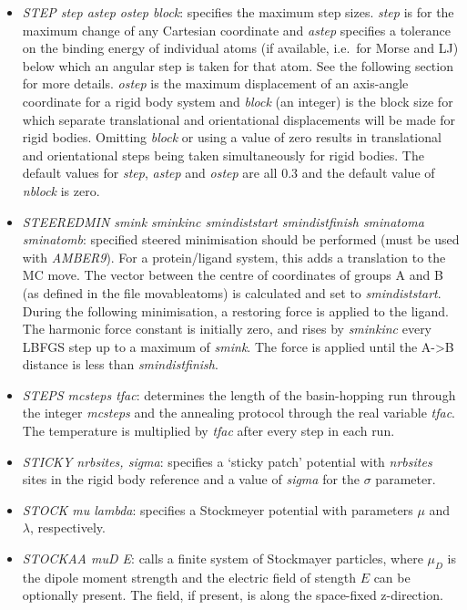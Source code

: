 \documentclass[12pt,a4paper,dvips]{article}
\begin{document}
\begin{itemize}
\item {\it STEP step astep ostep block\/}: specifies the maximum step sizes. {\it step\/} is
for the maximum change of any Cartesian coordinate and {\it astep\/} specifies a tolerance
on the binding energy of individual atoms (if available, i.e.~for Morse and LJ) below
which an angular step is taken for that atom. See the following section for more details.
{\it ostep\/} is the maximum displacement of an axis-angle coordinate for a rigid body system
and {\it block\/} (an integer) is the block size for which separate translational and orientational
displacements will be made for rigid bodies. Omitting {\it block\/} or using a value of zero results in
translational and orientational steps being taken simultaneously
for rigid bodies. The default values for {\it step\/},
{\it astep\/} and {\it ostep\/} are all 0.3 and the default value of {\it nblock\/} is zero.

\item {\it STEEREDMIN smink sminkinc smindiststart smindistfinish sminatoma sminatomb\/}: specified steered 
minimisation should be performed (must be used with {\it AMBER9}). For a protein/ligand system, this adds a translation
to the MC move. The vector between the centre of coordinates of groups A and B (as defined in the file movableatoms)
is calculated and set to {\it smindiststart}. During the following minimisation, a restoring force is applied to 
the ligand. The harmonic force constant is initially zero, and rises by {\it sminkinc} every LBFGS step up to a
maximum of {\it smink}. The force is applied until the A->B distance is less than {\it smindistfinish}.  

\item {\it STEPS mcsteps tfac\/}: determines the length of the
basin-hopping run through the integer {\it mcsteps\/} and the annealing protocol through
the real variable {\it tfac\/}. The temperature is multiplied by {\it tfac\/}
after every step in each run. 

\item {\it STICKY nrbsites, sigma\/}: specifies a `sticky patch' potential with {\it nrbsites}
sites in the rigid body reference and a value of {\it sigma} for the $\sigma$ parameter.

\item {\it STOCK mu lambda}: specifies a Stockmeyer potential with parameters
$\mu$ and $\lambda$, respectively.

\item {\it STOCKAA muD E\/}: calls a finite system of Stockmayer particles,
where $\mu_{D}$ is the dipole moment strength and the electric field of stength $E$ can be optionally present. The field, if
present, is along the space-fixed z-direction.


\end{itemize}
\end{document}
